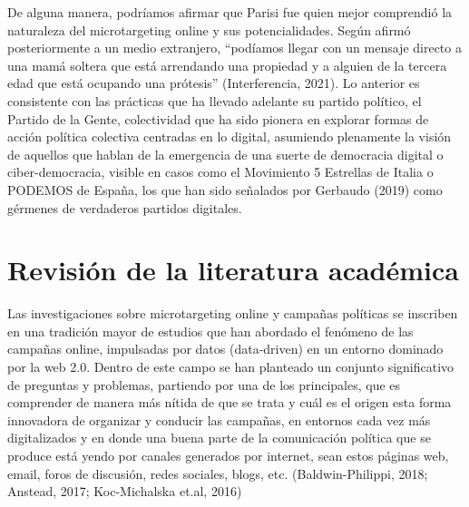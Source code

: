 \documentclass[
  10pt,
  letterpaper,
]{report}
\begin{document}
De alguna manera, podríamos afirmar que Parisi fue quien mejor
comprendió la naturaleza del microtargeting online y sus
potencialidades. Según afirmó posteriormente a un medio extranjero,
``podíamos llegar con un mensaje directo a una mamá soltera que está
arrendando una propiedad y a alguien de la tercera edad que está
ocupando una prótesis'' (Interferencia, 2021). Lo anterior es
consistente con las prácticas que ha llevado adelante su partido
político, el Partido de la Gente, colectividad que ha sido pionera en
explorar formas de acción política colectiva centradas en lo digital,
asumiendo plenamente la visión de aquellos que hablan de la emergencia
de una suerte de democracia digital o ciber-democracia, visible en casos
como el Movimiento 5 Estrellas de Italia o PODEMOS de España, los que
han sido señalados por Gerbaudo (2019) como gérmenes de verdaderos
partidos digitales.

\hypertarget{revisiuxf3n-de-la-literatura-acaduxe9mica}{%
\section{Revisión de la literatura
académica}\label{revisiuxf3n-de-la-literatura-acaduxe9mica}}

Las investigaciones sobre microtargeting online y campañas políticas se
inscriben en una tradición mayor de estudios que han abordado el
fenómeno de las campañas online, impulsadas por datos (data-driven) en
un entorno dominado por la web 2.0. Dentro de este campo se han
planteado un conjunto significativo de preguntas y problemas, partiendo
por una de los principales, que es comprender de manera más nítida de
que se trata y cuál es el origen esta forma innovadora de organizar y
conducir las campañas, en entornos cada vez más digitalizados y en donde
una buena parte de la comunicación política que se produce está yendo
por canales generados por internet, sean estos páginas web, email, foros
de discusión, redes sociales, blogs, etc. (Baldwin-Philippi, 2018;
Anstead, 2017; Koc-Michalska et.al, 2016)
\end{document}
